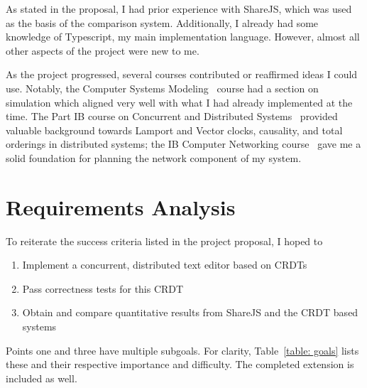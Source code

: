 \documentclass[12pt,a4paper,twoside,openright]{report}
\begin{document}
As stated in the proposal, I had prior experience with ShareJS, which was used as the basis of the comparison system. Additionally, I already had some knowledge of Typescript, my main implementation language. However, almost all other aspects of the project were new to me.

As the project progressed, several courses contributed or reaffirmed ideas I could use. Notably, the Computer Systems Modeling~\cite{compsysmodeling} course had a section on simulation which aligned very well with what I had already implemented at the time. The Part IB course on Concurrent and Distributed Systems~\cite{concdistsystems} provided valuable background towards Lamport and Vector clocks, causality, and total orderings in distributed systems; the IB Computer Networking course~\cite{computernetworking} gave me a solid foundation for planning the network component of my system.



\section{Requirements Analysis}
To reiterate the success criteria listed in the project proposal, I hoped to

\begin{enumerate}
\item Implement a concurrent, distributed text editor based on CRDTs 
\item Pass correctness tests for this CRDT
\item Obtain and compare quantitative results from ShareJS and the CRDT based systems
\end{enumerate}

Points one and three have multiple subgoals. For clarity, Table~\ref{table: goals} lists these and their respective importance and difficulty. The completed extension is included as well.
\end{document}
